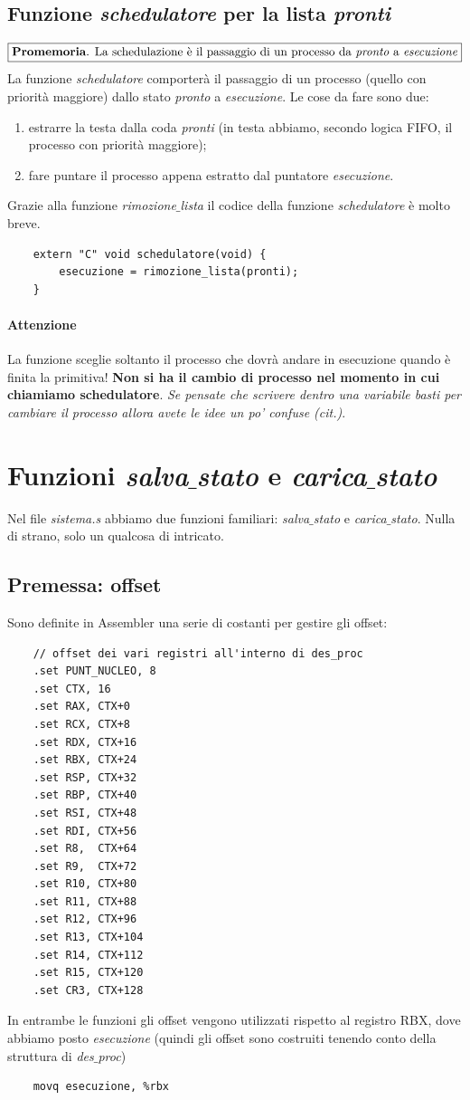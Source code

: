 \subsection{Funzione \emph{schedulatore} per la lista \emph{pronti}}
\[\boxed{\text{\textbf{Promemoria}. La schedulazione è il passaggio di un processo da \emph{pronto} a \emph{esecuzione}}}\]
La funzione \emph{schedulatore} comporterà il passaggio di un processo (quello con priorità maggiore) dallo stato \emph{pronto} a \emph{esecuzione}. Le cose da fare sono due:
\begin{enumerate}
	\item estrarre la testa dalla coda \emph{pronti} (in testa abbiamo, secondo logica FIFO, il processo con priorità maggiore);
	\item fare puntare il processo appena estratto dal puntatore \emph{esecuzione}.
\end{enumerate}
Grazie alla funzione \emph{rimozione$\_$lista} il codice della funzione \emph{schedulatore} è molto breve.
\small
\begin{verbatim}
	extern "C" void schedulatore(void) {
		esecuzione = rimozione_lista(pronti);
	}
\end{verbatim}
\normalsize
\paragraph{Attenzione} La funzione sceglie soltanto il processo che dovrà andare in esecuzione quando è finita la primitiva! \textbf{Non si ha il cambio di processo nel momento in cui chiamiamo schedulatore}. \textit{Se pensate che scrivere dentro una variabile basti per cambiare il processo allora avete le idee un po' confuse (cit.)}.

\section{Funzioni \emph{salva$\_$stato} e \emph{carica$\_$stato}}

Nel file \emph{sistema.s} abbiamo due funzioni familiari: \emph{salva$\_$stato} e \emph{carica$\_$stato}. Nulla di strano, solo un qualcosa di intricato.

\subsection{Premessa: offset}
Sono definite in Assembler una serie di costanti per gestire gli offset:
\small 
\begin{verbatim}
	// offset dei vari registri all'interno di des_proc
	.set PUNT_NUCLEO, 8
	.set CTX, 16
	.set RAX, CTX+0
	.set RCX, CTX+8
	.set RDX, CTX+16
	.set RBX, CTX+24
	.set RSP, CTX+32
	.set RBP, CTX+40
	.set RSI, CTX+48
	.set RDI, CTX+56
	.set R8,  CTX+64
	.set R9,  CTX+72
	.set R10, CTX+80
	.set R11, CTX+88
	.set R12, CTX+96
	.set R13, CTX+104
	.set R14, CTX+112
	.set R15, CTX+120
	.set CR3, CTX+128
\end{verbatim}
\normalsize 
In entrambe le funzioni gli offset vengono utilizzati rispetto al registro RBX, dove abbiamo posto \emph{esecuzione} (quindi gli offset sono costruiti tenendo conto della struttura di \emph{des$\_$proc})
\begin{verbatim}
	movq esecuzione, %rbx
\end{verbatim}
